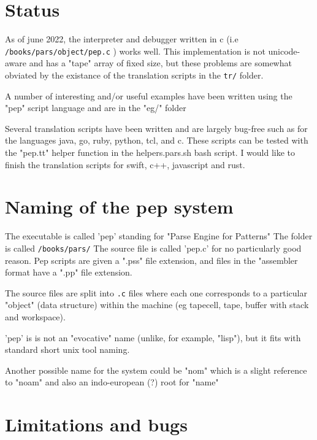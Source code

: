 \documentclass[a4paper,12pt]{article}
\begin{document}
\section{Status}

  As of june 2022, the interpreter and debugger written in c (i.e
  \texttt{/books/pars/object/pep.c} ) works well. This implementation is
  not unicode-aware and has a "tape" array of fixed size, but these
  problems are somewhat obviated by the existance of the translation
  scripts in the \texttt{tr/} folder.

  A number of interesting and/or useful examples have been written using the
  "pep" script language and are in the "eg/" folder

  Several translation scripts have been written and are largely bug-free
  such as for the languages java, go, ruby, python, tcl, and c. These
  scripts can be tested with the "pep.tt" helper function in the
  helpers.pars.sh bash script. I would like to finish the translation
  scripts for swift, c++, javascript and rust.

\section{Naming of the pep system}

  The executable is called 'pep' standing for "Parse Engine for Patterns"
  The folder is called \texttt{/books/pars/}
  The source file is called 'pep.c' for no particularly good reason.
  Pep scripts are given a ".pss" file extension, and files in the
  "assembler format have a ".pp" file extension.

  The source files are split into \texttt{.c} files where each one corresponds to a
  particular "object" (data structure) within the machine (eg tapecell, tape,
  buffer with stack and workspace).

  'pep' is is not an "evocative" name (unlike, for example, "lisp"),
  but it fits with standard short unix tool naming.

  Another possible name for the system could be "nom" which is a
  slight reference to "noam" and also an indo-european (?) root
  for "name"

\section{Limitations and bugs}
\end{document}
